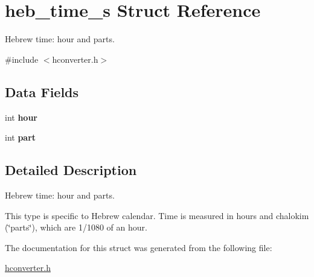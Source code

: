 \hypertarget{structheb__time__s}{}\section{heb\+\_\+time\+\_\+s Struct Reference}
\label{structheb__time__s}


Hebrew time\+: hour and parts.  




{\ttfamily \#include $<$hconverter.\+h$>$}

\subsection*{Data Fields}
\begin{DoxyCompactItemize}
\item 
\hypertarget{structheb__time__s_aa3d9e5e6f1a731afea52e89173534fba}{}int {\bfseries hour}\label{structheb__time__s_aa3d9e5e6f1a731afea52e89173534fba}

\item 
\hypertarget{structheb__time__s_aa912b13359bc0d46caf24b409aef6164}{}int {\bfseries part}\label{structheb__time__s_aa912b13359bc0d46caf24b409aef6164}

\end{DoxyCompactItemize}


\subsection{Detailed Description}
Hebrew time\+: hour and parts. 

This type is specific to Hebrew calendar. Time is measured in hours and chalokim (\char`\"{}parts\char`\"{}), which are 1/1080 of an hour. 

The documentation for this struct was generated from the following file\+:\begin{DoxyCompactItemize}
\item 
\hyperlink{hconverter_8h}{hconverter.\+h}\end{DoxyCompactItemize}
